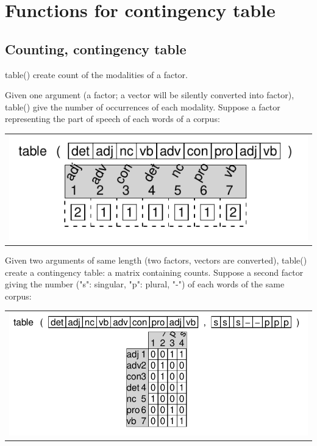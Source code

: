 \documentclass[pdflatex]{article}
\begin{document}
\section{Functions for contingency table}

\subsection{Counting, contingency table}

table() create count of the modalities of a factor. 

Given one argument (a factor; a vector will be silently converted into factor), table() give the number of occurrences of each modality. Suppose a factor representing the part of speech of each words of a corpus:

\begin{tabular}{c}
\includegraphics{table_1.pdf}
\end{tabular}


Given two arguments of same length (two factors, vectors are converted), table() create a contingency table: a matrix containing counts. Suppose a second factor giving the number ("s": singular, "p": plural, "-") of each words of the same corpus:

\begin{tabular}{c}
\includegraphics{table_2.pdf}
\end{tabular}
\end{document}

